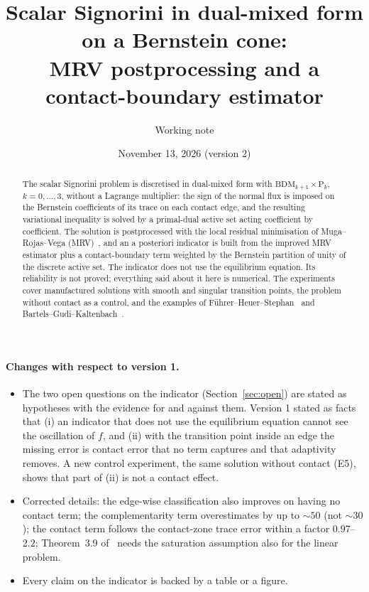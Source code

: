 \documentclass[11pt,a4paper]{article}
\title{Scalar Signorini in dual-mixed form on a Bernstein cone:\\
MRV postprocessing and a contact-boundary estimator}
\author{Working note}
\date{November 13, 2026 (version 2)}
\theoremstyle{definition}
\newcommand{\BDM}{\mathrm{BDM}}
\newcommand{\Pk}[1]{\mathrm{P}_{#1}}
\begin{document}
\maketitle

\begin{abstract}
The scalar Signorini problem is discretised in dual-mixed form with $\BDM_{k+1}\times\Pk{k}$,
\mbox{$k=0,\dots,3$}, without a Lagrange multiplier: the sign of the normal flux is imposed on the
Bernstein coefficients of its trace on each contact edge, and the resulting variational inequality
is solved by a primal-dual active set acting coefficient by coefficient. The solution is
postprocessed with the local residual minimisation of Muga--Rojas--Vega (MRV)~\cite{mrv}, and an a
posteriori indicator is built from the improved MRV estimator plus a contact-boundary term weighted
by the Bernstein partition of unity of the discrete active set. The indicator does not use the
equilibrium equation. Its reliability is not proved; everything said about it here is numerical.
The experiments cover manufactured solutions with smooth and singular transition points, the
problem without contact as a control, and the examples of Führer--Heuer--Stephan~\cite{fhs} and
Bartels--Gudi--Kaltenbach~\cite{bgk}.
\end{abstract}

\paragraph{Changes with respect to version 1.}
\begin{itemize}
  \item The two open questions on the indicator (Section~\ref{sec:open}) are stated as hypotheses
        with the evidence for and against them. Version 1 stated as facts that (i) an indicator that
        does not use the equilibrium equation cannot see the oscillation of $f$, and (ii) with the
        transition point inside an edge the missing error is contact error that no term captures and
        that adaptivity removes. A new control experiment, the same solution without contact (E5),
        shows that part of (ii) is not a contact effect.
  \item Corrected details: the edge-wise classification also improves on having no contact term;
        the complementarity term overestimates by up to $\sim\!50$ (not $\sim\!30$); the contact
        term follows the contact-zone trace error within a factor $0.97$--$2.2$; Theorem~3.9
        of~\cite{mrv} needs the saturation assumption also for the linear problem.
  \item Every claim on the indicator is backed by a table or a figure.
\end{itemize}
\end{document}
